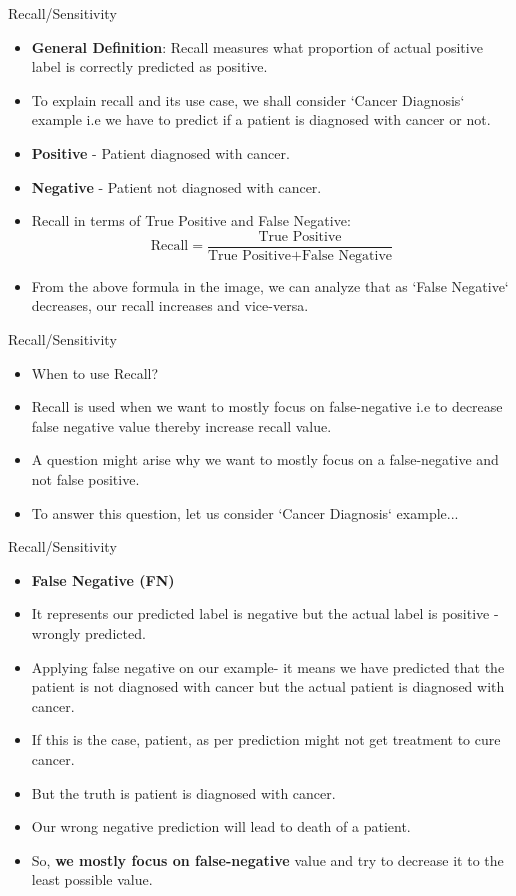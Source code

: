 \documentclass[11pt]{beamer}
\begin{document}
\begin{frame}{Recall/Sensitivity}
	\begin{itemize}
		\item \textbf{General Definition}: Recall measures what proportion of actual positive label is correctly predicted as positive.
		\item To explain recall and its use case, we shall consider `Cancer Diagnosis` example i.e we have to predict if a patient is diagnosed with cancer or not.
		\item \textbf{Positive} - Patient diagnosed with cancer.
		\item \textbf{Negative} - Patient not diagnosed with cancer.
		\item Recall in terms of True Positive and False Negative: $$\text{Recall} = \frac{\text{True Positive}}{\text{True Positive}+\text{False Negative}}$$
		\item From the above formula in the image, we can analyze that as `False Negative` decreases, our recall increases and vice-versa.
	\end{itemize}
\end{frame}
\begin{frame}{Recall/Sensitivity}
	\begin{itemize}
		\item When to use Recall?
		\item Recall is used when we want to mostly focus on false-negative i.e to decrease false negative value thereby increase recall value. 
		\item A question might arise why we want to mostly focus on a false-negative and not false positive. 
		\item To answer this question, let us consider `Cancer Diagnosis` example...
	\end{itemize}
\end{frame}
\begin{frame}{Recall/Sensitivity}
	\begin{itemize}
		\item \textbf{False Negative (FN)}
		\item It represents our predicted label is negative but the actual label is positive - wrongly predicted. 
		\item Applying false negative on our example- it means we have predicted that the patient is not diagnosed with cancer but the actual patient is diagnosed with cancer. 
		\item If this is the case, patient, as per prediction might not get treatment to cure cancer. 
		\item But the truth is patient is diagnosed with cancer. 
		\item Our wrong negative prediction will lead to death of a patient. 
		\item So, \textbf{we mostly focus on false-negative} value and try to decrease it to the least possible value.
	\end{itemize}
\end{frame}
\end{document}
